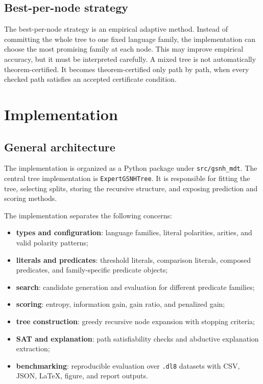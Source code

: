 \documentclass[11pt,a4paper]{article}
\begin{document}
\subsection{Best-per-node strategy}

The best-per-node strategy is an empirical adaptive method. Instead of committing the whole tree to one fixed language family, the implementation can choose the most promising family at each node. This may improve empirical accuracy, but it must be interpreted carefully. A mixed tree is not automatically theorem-certified. It becomes theorem-certified only path by path, when every checked path satisfies an accepted certificate condition.

\section{Implementation}

\subsection{General architecture}

The implementation is organized as a Python package under \texttt{src/gsnh\_mdt}. The central tree implementation is \texttt{ExpertGSNHTree}. It is responsible for fitting the tree, selecting splits, storing the recursive structure, and exposing prediction and scoring methods.

The implementation separates the following concerns:
\begin{itemize}
    \item \textbf{types and configuration}: language families, literal polarities, arities, and valid polarity patterns;
    \item \textbf{literals and predicates}: threshold literals, comparison literals, composed predicates, and family-specific predicate objects;
    \item \textbf{search}: candidate generation and evaluation for different predicate families;
    \item \textbf{scoring}: entropy, information gain, gain ratio, and penalized gain;
    \item \textbf{tree construction}: greedy recursive node expansion with stopping criteria;
    \item \textbf{SAT and explanation}: path satisfiability checks and abductive explanation extraction;
    \item \textbf{benchmarking}: reproducible evaluation over \texttt{.dl8} datasets with CSV, JSON, LaTeX, figure, and report outputs.
\end{itemize}
\end{document}
